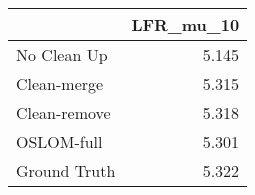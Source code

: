 \begin{tabular}{lr}
\toprule
{} & LFR_mu_10 \\
\midrule
No Clean Up  &     5.145 \\
Clean-merge  &     5.315 \\
Clean-remove &     5.318 \\
OSLOM-full   &     5.301 \\
Ground Truth &     5.322 \\
\bottomrule
\end{tabular}

